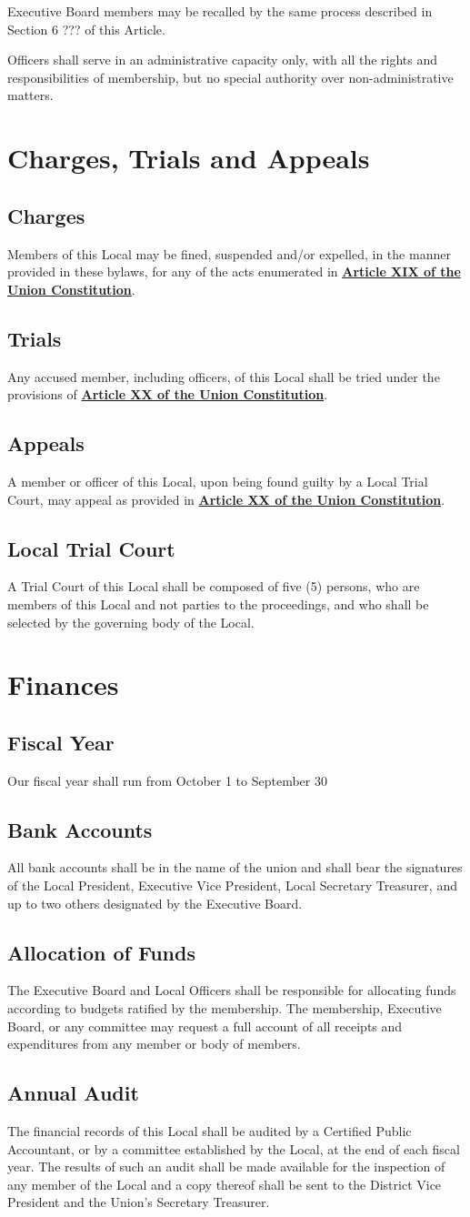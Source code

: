 \documentclass[11pt]{article}
\let\oldhref\href
\renewcommand{\href}[2]{\oldhref{#1}{\bfseries#2}}
\newcommand{\article}[1]{\vspace{.75cm}\section{#1}}
\newcommand{\articlesection}[1]{\vspace{.25cm}\subsection{#1}}
\begin{document}
Executive Board members may be recalled by the same process described in Section 6 ??? of this Article.

Officers shall serve in an administrative capacity only, with all the rights and responsibilities of membership, but no special authority over non-administrative matters.

\article{Charges, Trials and Appeals}
\articlesection{Charges}
Members of this Local may be fined, suspended and/or expelled, in the manner provided in these bylaws, for any of  the acts enumerated in \href{https://cwa-union.org/for-locals/cwa-constitution\#A19}{Article XIX of the Union Constitution}.

\articlesection{Trials}
Any accused member, including officers, of this Local shall be tried under the provisions of \href{https://cwa-union.org/for-locals/cwa-constitution\#A20}{Article XX of the Union  Constitution}.

\articlesection{Appeals}
A member or officer of this Local, upon being found guilty by a Local Trial Court, may appeal as provided in \href{https://cwa-union.org/for-locals/cwa-constitution\#A20}{Article XX of the Union Constitution}.

\articlesection{Local Trial Court}
A Trial Court of this Local shall be composed of five (5) persons, who are members of this Local and not parties to the proceedings, and who shall be selected by the governing body of the Local.

\article{Finances}
\articlesection{Fiscal Year}
Our fiscal year shall run from October 1 to September 30

\articlesection{Bank Accounts}
All bank accounts shall be in the name of the union and shall bear the signatures of the Local President, Executive Vice President, Local Secretary Treasurer, and up to two others designated by the Executive Board.

\articlesection{Allocation of Funds}
The Executive Board and Local Officers shall be responsible for allocating funds according to budgets ratified by the membership. The membership, Executive Board, or any committee may request a full account of all receipts and expenditures from any member or body of members.

\articlesection{Annual Audit}
The financial records of this Local shall be audited by a Certified Public Accountant, or by a committee established by the Local, at the end of each fiscal year. The results of such an audit shall be made available for the inspection of any member of the Local and a copy thereof shall be sent to the District Vice President and the Union’s Secretary Treasurer.
\end{document}
